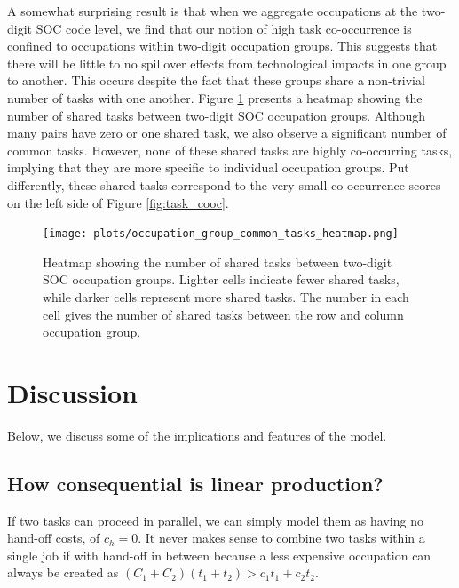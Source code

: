\documentclass{article}
\theoremstyle{plain}
\theoremstyle{plain}
\begin{document}
A somewhat surprising result is that when we aggregate occupations at the two-digit SOC code level, we find that our notion of high task co-occurrence is confined to occupations within two-digit occupation groups. 
This suggests that there will be little to no spillover effects from technological impacts in one group to another.
This occurs despite the fact that these groups share a non-trivial number of tasks with one another. 
Figure \ref{fig:occ_gp_task_heatmap} presents a heatmap showing the number of shared tasks between two-digit SOC occupation groups. 
Although many pairs have zero or one shared task, we also observe a significant number of common tasks. 
However, none of these shared tasks are highly co-occurring tasks, implying that they are more specific to individual occupation groups.
Put differently, these shared tasks correspond to the very small co-occurrence scores on the left side of Figure \ref{fig:task_cooc}.

\begin{figure}[htbp]
  \centering
  \texttt{[image: plots/occupation\_group\_common\_tasks\_heatmap.png]}
  \caption{Heatmap showing the number of shared tasks between two-digit SOC occupation groups. Lighter cells indicate fewer shared tasks, while darker cells represent more shared tasks. The number in each cell gives the number of shared tasks between the row and column occupation group.}
  \label{fig:occ_gp_task_heatmap}
\end{figure}


\section{Discussion}
Below, we discuss some of the implications and features of the model. 

\subsection{How consequential is linear production?}
If two tasks can proceed in parallel, we can simply model them as having no hand-off costs, of $c_h = 0$.
It never makes sense to combine two tasks within a single job if with hand-off in between because a less expensive occupation can always be created as $(C_1 + C_2) (t_1 + t_2) > c_1 t_1 + c_2 t_2$.
\end{document}
